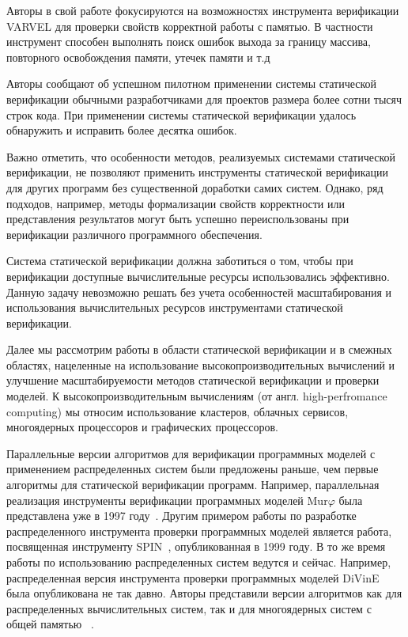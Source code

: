 \documentclass[%
candidate,     %
href,        %
colorlinks,  %
]{disser}
\begin{document}
Авторы в свой работе фокусируются на возможностях инструмента верификации VARVEL для проверки свойств корректной работы с памятью.
В частности инструмент способен выполнять поиск ошибок выхода за границу массива, повторного освобождения памяти, утечек памяти и т.д

Авторы сообщают об успешном пилотном применении системы статической верификации обычными разработчиками для проектов размера более сотни тысяч строк кода.
При применении системы статической верификации удалось обнаружить и исправить более десятка ошибок. 

Важно отметить, что особенности методов, реализуемых системами статической верификации, не позволяют применить инструменты статической верификации для других программ без существенной доработки самих систем.  
Однако, ряд подходов, например, методы формализации свойств корректности или представления результатов могут быть успешно переиспользованы при верификации различного программного обеспечения. 


Система статической верификации должна заботиться о том, чтобы при верификации доступные вычислительные ресурсы использовались эффективно.
Данную задачу невозможно решать без учета особенностей масштабирования и использования вычислительных ресурсов инструментами статической верификации.

Далее мы рассмотрим работы в области статической верификации и в смежных областях, нацеленные на использование высокопроизводительных вычислений и улучшение масштабируемости методов статической верификации и проверки моделей.
К высокопроизводительным вычислениям (от англ. high-perfromance computing) мы относим использование кластеров, облачных сервисов, многоядерных процессоров и графических процессоров.

Параллельные версии алгоритмов для верификации программных моделей с применением распределенных систем были предложены раньше, чем первые алгоритмы для статической верификации программ.
Например, параллельная реализация инструменты верификации программных моделей Mur$\varphi$ была представлена уже в 1997 году~\cite{Stern97parallelizingthe}.
Другим примером работы по разработке распределенного инструмента проверки программных моделей является работа, посвященная инструменту SPIN~\cite{Lerda1999}, опубликованная в 1999 году.
В то же время работы по использованию распределенных систем ведутся и сейчас.
Например, распределенная версия инструмента проверки программных моделей DiVinE~\cite{VW86b} была опубликована не так давно.
Авторы представили версии алгоритмов как для распределенных вычислительных систем, так и для многоядерных систем с общей памятью ~\cite{Barnat:2010:SSM,HiBi.2009,Barnat2009,Barnat5161000}.
\end{document}
